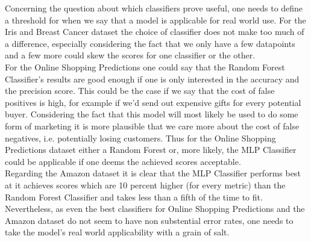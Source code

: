\documentclass{article}
\begin{document}
Concerning the question about which classifiers prove useful, one needs to define a threshold for when we say that a model is applicable for real world use. For the Iris and Breast Cancer dataset the choice of classifier does not make too much of a difference, especially considering the fact that we only have a few datapoints and a few more could skew the scores for one classifier or the other. \\
For the Online Shopping Predictions one could say that the Random Forest Classifier's results are good enough if one is only interested in the accuracy and the precision score. This could be the case if we say that the cost of false positives is high, for example if we'd send out expensive gifts for every potential buyer. Considering the fact that this model will most likely be used to do some form of marketing it is more plausible that we care more about the cost of false negatives, i.e. potentially losing customers. Thus for the Online Shopping Predictions dataset either a Random Forest or, more likely, the MLP Classifier could be applicable if one deems the achieved scores acceptable. \\
Regarding the Amazon dataset it is clear that the MLP Classifier performs best at it achieves scores which are 10 percent higher (for every metric) than the Random Forest Classifier and takes less than a fifth of the time to fit. Nevertheless, as even the best classifiers for Online Shopping Predictions and the Amazon dataset do not seem to have non substential error rates, one needs to take the model's real world applicability with a grain of salt. \\
\newline
\end{document}
